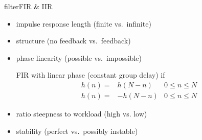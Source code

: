 	\begin{frame}{filter}{FIR \& IIR}
		\begin{itemize}
			\item	impulse response length (finite vs.\ infinite)
			\pause
			\item	structure (no feedback vs.\ feedback)
			\pause
			\item	phase linearity (possible vs.\ impossible)
					\pause
					
					FIR with linear phase (constant group delay) if
					\begin{eqnarray}
						h(n) =& h(N-n) & 0\leq n\leq N\\
						h(n) =& -h(N-n) & 0\leq n\leq N
					\end{eqnarray}
			\pause
			\item	ratio steepness to workload (high vs. low)
			\pause
			\item	stability (perfect vs.\ possibly instable)
		\end{itemize}
	\end{frame}

